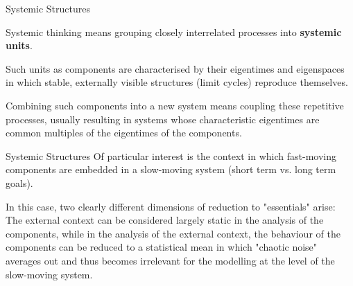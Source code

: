 \documentclass{beamer}
\title{Modelling Sustainable Systems\\ and Semantic Web\\[6pt]
  Systemic Structures and Action Spaces
  \vskip1em}
\subtitle{Lecture in the Module 10-202-2312\\ for Master Computer Science}
\author{Prof. Dr. Hans-Gert Gräbe\\
\url{http://www.informatik.uni-leipzig.de/~graebe}}
\date{May 2022}
\begin{document}
{
\begin{frame}
  \titlepage
\end{frame}}

\begin{frame}{Systemic Structures}

Systemic thinking means grouping closely interrelated processes into
\textbf{systemic units}.

Such units as components are characterised by their eigentimes and eigenspaces
in which stable, externally visible structures (limit cycles) reproduce
themselves.

Combining such components into a new system means coupling these repetitive
processes, usually resulting in systems whose characteristic eigentimes are
common multiples of the eigentimes of the components.

\end{frame}

\begin{frame}{Systemic Structures}
Of particular interest is the context in which fast-moving components are
embedded in a slow-moving system (short term vs. long term goals).

In this case, two clearly different dimensions of reduction to "essentials"
arise: The external context can be considered largely static in the analysis
of the components, while in the analysis of the external context, the
behaviour of the components can be reduced to a statistical mean in which
"chaotic noise" averages out and thus becomes irrelevant for the modelling at
the level of the slow-moving system.

\end{frame}
\end{document}
